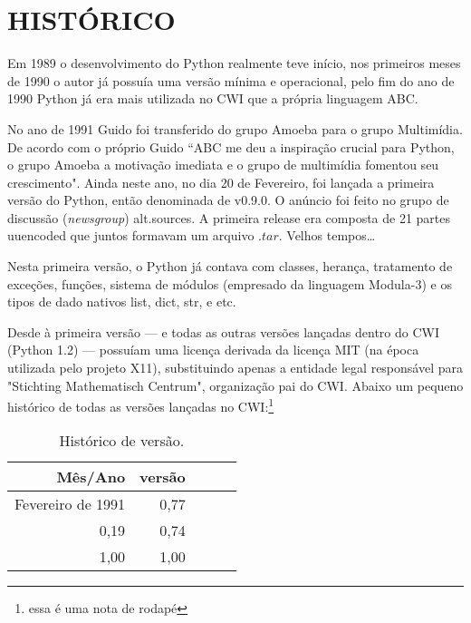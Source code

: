 
\chapter{HISTÓRICO}
\label{chap:fundamentacaoTeorica}

Em 1989 o desenvolvimento do Python realmente teve início, nos primeiros meses de 1990 o autor já possuía uma versão mínima e operacional, pelo fim do ano de 1990 Python já era mais utilizada no CWI que a própria linguagem ABC.
\par No ano de 1991 Guido foi transferido do grupo Amoeba para o grupo Multimídia.
De acordo com o próprio Guido “ABC me deu a inspiração crucial para Python, o grupo Amoeba a motivação imediata e o grupo de multimídia fomentou seu crescimento". Ainda neste ano, no dia 20 de Fevereiro, foi lançada a primeira versão do Python, então denominada de v0.9.0. O anúncio foi feito no grupo de discussão (\textit{newsgroup}) alt.sources. A primeira release era composta de 21 partes uuencoded que juntos formavam um arquivo $.tar$. Velhos tempos…
\par Nesta primeira versão, o Python já contava com classes, herança, tratamento de exceções, funções, sistema de módulos (empresado da linguagem Modula-3) e os tipos de dado nativos list, dict, str, e etc.
\par Desde à primeira versão — e todas as outras versões lançadas dentro do CWI (Python 1.2) — possuíam uma licença derivada da licença MIT (na época utilizada pelo projeto X11), substituindo apenas a entidade legal responsável para "Stichting Mathematisch Centrum", organização pai do CWI. Abaixo um pequeno histórico de todas as versões lançadas no CWI:\footnote{
    essa é uma nota de rodapé
}

\begin{table}[!htb]
    \centering
    \caption[Histórico de versão]{Histórico de versão.
    \label{tab:Historico-versao}}
    \begin{tabular}{rrrrr}
        \toprule
        Mês/Ano & versão \\
        \midrule
        Fevereiro de 1991 & 0,77  \\
            0,19 & 0,74  \\
            1,00 & 1,00  \\
        \bottomrule
    \end{tabular}
\end{table}